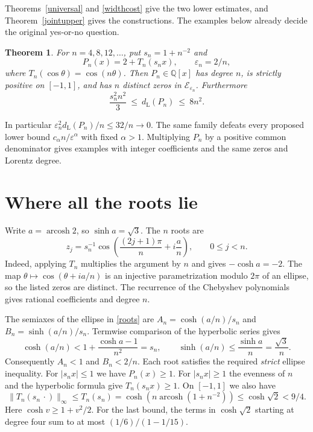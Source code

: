 \documentclass[11pt]{article}
\newtheorem{theorem}{Theorem}
\newcommand{\norm}[1]{\lVert #1\rVert_\infty}
\newcommand{\dd}{d_{\mathrm L}}
\begin{document}
Theorems~\ref{universal} and \ref{widthcost} give the two lower estimates, and Theorem~\ref{jointupper} gives the constructions. The examples below already decide the original yes-or-no question.

\begin{theorem}\label{main}
For $n=4,8,12,\ldots$, put $s_n=1+n^{-2}$ and
\[
                  P_n(x)=2+T_n(s_nx), \qquad \varepsilon_n=2/n,
\]
where $T_n(\cos\theta)=\cos(n\theta)$. Then $P_n\in\mathbb Q[x]$ has degree $n$, is strictly positive on $[-1,1]$, and has $n$ distinct zeros in $\mathcal E_{\varepsilon_n}$. Furthermore
\begin{equation}\label{bound}
              \frac{s_n^2 n^2}{3}\ \le\ \dd(P_n)\ \le\ 8 n^2 .
\end{equation}
\end{theorem}

In particular $\varepsilon_n^2\dd(P_n)/n\le32/n\longrightarrow0$. The same family defeats every proposed lower bound $c_\alpha n/\varepsilon^\alpha$ with fixed $\alpha>1$. Multiplying $P_n$ by a positive common denominator gives examples with integer coefficients and the same zeros and Lorentz degree.

\section{Where all the roots lie}
Write $a=\operatorname{arcosh}2$, so $\sinh a=\sqrt3$. The $n$ roots are
\begin{equation}\label{roots}
 z_j=s_n^{-1}\cos\!\left(\frac{(2j+1)\pi}{n}+i\frac an\right),
                 \qquad 0\le j<n.
\end{equation}
Indeed, applying $T_n$ multiplies the argument by $n$ and gives $-\cosh a=-2$. The map $\theta\mapsto\cos(\theta+i a/n)$ is an injective parametrization modulo $2\pi$ of an ellipse, so the listed zeros are distinct. The recurrence of the Chebyshev polynomials gives rational coefficients and degree $n$.

The semiaxes of the ellipse in \eqref{roots} are $A_n=\cosh(a/n)/s_n$ and $B_n=\sinh(a/n)/s_n$. Termwise comparison of the hyperbolic series gives
\[
 \cosh(a/n)<1+\frac{\cosh a-1}{n^2}=s_n,\qquad
 \sinh(a/n)\le\frac{\sinh a}{n}=\frac{\sqrt3}{n}.
\]
Consequently $A_n<1$ and $B_n<2/n$. Each root satisfies the required \emph{strict} ellipse inequality.
For $|s_n x|\le1$ we have $P_n(x)\ge1$. For $|s_nx|\ge1$ the evenness of $n$ and the hyperbolic formula give $T_n(s_nx)\ge1$. On $[-1,1]$ we also have
\begin{equation}\label{sup}
 \norm{T_n(s_n\,\cdot)}\le T_n(s_n)
 =\cosh(n\operatorname{arcosh}(1+n^{-2}))\le\cosh\sqrt2<9/4 .
\end{equation}
Here $\cosh v\ge1+v^2/2$. For the last bound, the terms in $\cosh\sqrt2$ starting at degree four sum to at most $(1/6)/(1-1/15)$.
\end{document}
